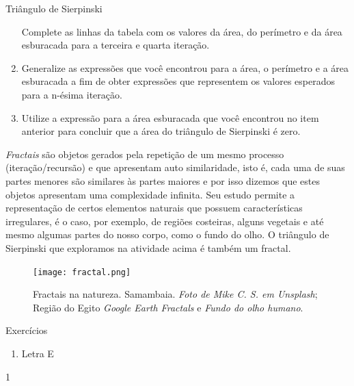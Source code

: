 \begin{task}{Triângulo de Sierpinski}
\begin{enumerate}
Complete as linhas da tabela com os valores da área, do perímetro e da área esburacada para a terceira e quarta iteração.

\item{}
Generalize as expressões que você encontrou para a área, o perímetro e a área esburacada a fim de obter expressões que representem os valores esperados para a n-ésima iteração.

\item{}
Utilize a expressão para a área esburacada que você encontrou no item anterior para concluir que a área do triângulo de Sierpinski é zero.

\end{enumerate}

\end{task}

\begin{knowledge}

\textit{Fractais} são objetos gerados pela repetição de um mesmo processo (iteração/recursão) e que apresentam auto similaridade, isto é, cada uma de suas partes menores são similares às partes maiores e por isso dizemos que estes objetos apresentam uma complexidade infinita. Seu estudo permite a representação de certos elementos naturais que possuem características irregulares, é o caso, por exemplo, de regiões costeiras, alguns vegetais e até mesmo algumas partes do nosso corpo, como o fundo do olho. O triângulo de Sierpinski que exploramos na atividade acima é também um fractal.


\begin{figure}[H]
	\centering
	\texttt{[image: fractal.png]}
	\caption{Fractais na natureza. Samambaia.
\textit{Foto de Mike C. S. em Unsplash}; Região do Egito \textit{Google Earth Fractals} e \textit{Fundo do olho humano}.
}
\end{figure}

\end{knowledge}
\clearpage
\def\currentcolor{cor1}
\marginpar{\vspace{.5em}}
\begin{answer}{Exercícios}
{\exerciselist
	\begin{enumerate}
	\item Letra E
	\end{enumerate}
}{1}
\end{answer}
